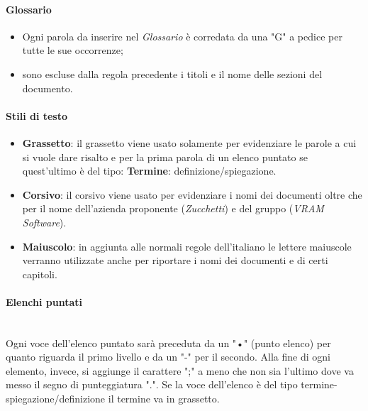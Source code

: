                 \paragraph{Glossario}
                    \begin{itemize}
                        \item Ogni parola da inserire nel \textit{Glossario} è corredata da una "G" a pedice per tutte le sue occorrenze;
                        \item sono escluse dalla regola precedente i titoli e il nome delle sezioni del documento.
                    \end{itemize}
                \paragraph{Stili di testo}
                \begin{itemize}
                    \item \textbf{Grassetto}: il grassetto viene usato solamente per evidenziare le parole a cui si vuole dare risalto e per la prima parola
                                              di un elenco puntato se quest'ultimo è del tipo: \textbf{Termine}: definizione/spiegazione.
                    \item \textbf{Corsivo}: il corsivo viene usato per evidenziare i nomi dei documenti oltre che per il nome dell'azienda
                                            proponente (\textit{Zucchetti}) e del gruppo (\textit{VRAM Software}).
                    \item \textbf{Maiuscolo}: in aggiunta alle normali regole dell'italiano le lettere maiuscole verranno utilizzate anche per riportare i nomi dei
                                              documenti e di certi capitoli.
                \end{itemize}
                \paragraph{Elenchi puntati}\mbox{}\\ [1mm]
                    Ogni voce dell'elenco puntato sarà preceduta da un "•" (punto elenco) per quanto riguarda il primo livello e da un "-" per il secondo.
                    Alla fine di ogni elemento, invece, si aggiunge il carattere ";" a meno che non sia l'ultimo dove va messo il segno di punteggiatura ".".
                    Se la voce dell'elenco è del tipo termine-spiegazione/definizione il termine va in grassetto.
